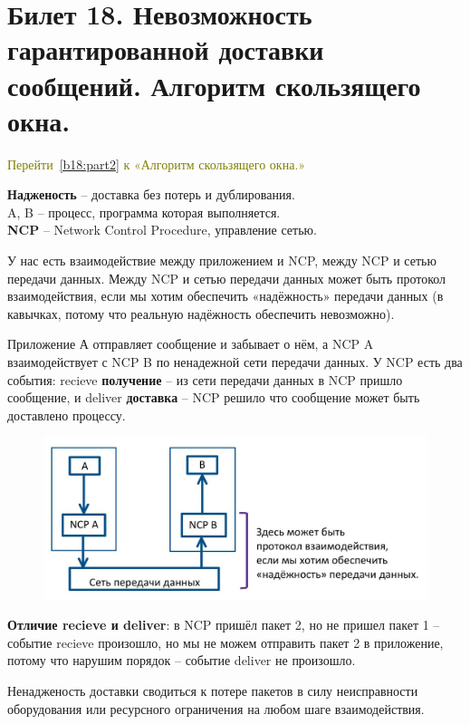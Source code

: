 \newpage
\section{Билет 18. Невозможность гарантированной доставки сообщений. Алгоритм скользящего окна.} \label{b18:part1}

\textcolor{olive}{Перейти~\ref{b18:part2} к «Алгоритм скользящего окна.»}

\textbf{Надженость} -- доставка без потерь и дублирования. \\
A, B -- процесс, программа которая выполняется.\\
\textbf{NCP} -- Network Control Procedure, управление сетью.

У нас есть взаимодействие между приложением и NCP, между NCP и сетью передачи данных.
Между NCP и сетью передачи данных может быть протокол взаимодействия, если мы хотим обеспечить «надёжность» передачи данных (в кавычках, потому что реальную надёжность обеспечить невозможно).

Приложение А отправляет сообщение и забывает о нём, а NCP A взаимодействует с NCP B по ненадежной сети передачи данных.
У NCP есть два события: recieve \textbf{получение} -- из сети передачи данных в NCP пришло сообщение, и deliver \textbf{доставка} -- NCP решило что сообщение может быть доставлено процессу.

\newline
\begin{figure}[H] \centering
	\includegraphics[scale = 0.35]{18/common.jpg}
\end{figure}

\textbf{Отличие recieve и deliver}: в NCP пришёл пакет 2, но не пришел пакет 1 -- событие recieve произошло, но мы не можем отправить пакет 2 в приложение, потому что нарушим порядок -- событие deliver не произошло.

Ненадженость доставки сводиться к потере пакетов в силу неисправности оборудования или ресурсного ограничения на любом шаге взаимодействия.
\bigskip

